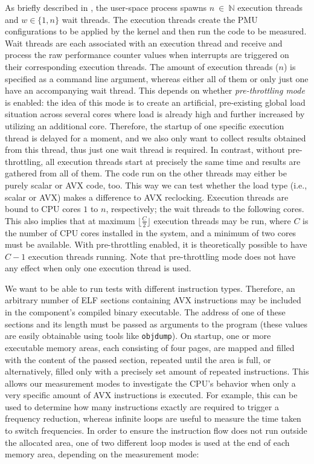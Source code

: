 As briefly described in , the user-space process spawns $n~\in~\mathbb{N}$ execution threads and $w\in\{1,n\}$ wait threads. The execution threads create the \gls{PMU} configurations to be applied by the kernel and then run the code to be measured. Wait threads are each associated with an execution thread and receive and process the raw performance counter values when interrupts are triggered on their corresponding execution threads. The amount of execution threads ($n$) is specified as a command line argument, whereas either all of them or only just one have an accompanying wait thread. This depends on whether \emph{pre-throttling mode} is enabled: the idea of this mode is to create an artificial, pre-existing global load situation across several cores where load is already high and further increased by utilizing an additional core. Therefore, the startup of one specific execution thread is delayed for a moment, and we also only want to collect results obtained from this thread, thus just one wait thread is required. In contrast, without pre-throttling, all execution threads start at precisely the same time and results are gathered from all of them. The code run on the other threads may either be purely scalar or \gls{AVX} code, too. This way we can test whether the load type (i.e., scalar or \gls{AVX}) makes a difference to \gls{AVX} reclocking. Execution threads are bound to \gls{CPU} cores $1$ to $n$, respectively; the wait threads to the following cores. This also implies that at maximum $\lfloor{}\frac{C}{2}\rfloor{}$ execution threads may be run, where $C$ is the number of \gls{CPU} cores installed in the system, and a minimum of two cores must be available. With pre-throttling enabled, it is theoretically possible to have $C-1$ execution threads running. Note that pre-throttling mode does not have any effect when only one execution thread is used.

We want to be able to run tests with different instruction types. Therefore, an arbitrary number of \gls{ELF} sections containing \gls{AVX} instructions may be included in the component's compiled binary executable. The address of one of these sections and its length must be passed as arguments to the program (these values are easily obtainable using tools like \texttt{objdump}). On startup, one or more executable memory areas, each consisting of four pages, are mapped and filled with the content of the passed section, repeated until the area is full, or alternatively, filled only with a precisely set amount of repeated instructions. This allows our measurement modes to investigate the \gls{CPU}'s behavior when only a very specific amount of \gls{AVX} instructions is executed. For example, this can be used to determine how many instructions exactly are required to trigger a frequency reduction, whereas infinite loops are useful to measure the time taken to switch frequencies. In order to ensure the instruction flow does not run outside the allocated area, one of two different loop modes is used at the end of each memory area, depending on the measurement mode:

